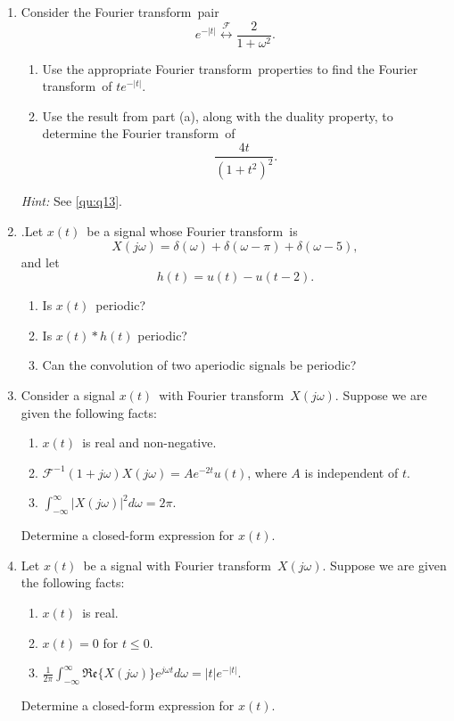 \documentclass[11pt]{article}
\newcommand\ft{Fourier transform}
\newcommand\xt{$x(t)$}
\newcommand\xo{$X(j\omega)$}
\begin{document}
\begin{enumerate}
    \item Consider the \ft~pair
    \begin{equation*}
        e^{-|t|} \overset{\mathcal{F}}{\longleftrightarrow} \frac{2}{1+\omega^2}.
    \end{equation*}
    \begin{enumerate}
        \item Use the appropriate \ft~properties to find the \ft~of $te^{-|t|}$.
        \item Use the result from part (a), along with the duality property, to determine the \ft~of
        \begin{equation*}
          \frac{4t}{(1+t^2)^2}.
        \end{equation*}
    \end{enumerate}
    \emph{Hint:} See \ref{qu:q13}.

    \item \label{qu:q13}.Let \xt~be a signal whose \ft~is
    \begin{equation*}
        X(j\omega) =\delta(\omega)+\delta(\omega -\pi) + \delta(\omega-5),
    \end{equation*}
    and let
    \begin{equation*}
        h(t) = u(t) - u(t-2).
    \end{equation*}
    \begin{enumerate}
        \item Is \xt~periodic?
        \item Is $x(t)\ast h(t)$ periodic?
        \item Can the convolution of two aperiodic signals be periodic?
    \end{enumerate}

    \item  Consider a signal \xt~with \ft~\xo. Suppose we are given the following facts:
    \begin{enumerate}
        \item \xt~is real and non-negative.
        \item $\mathcal{F}^{-1}{(1+j\omega)X(j\omega)} = Ae^{-2t}u(t)$, where $A$ is independent of $t$.
        \item $\int_{-\infty}^{\infty}|X(j\omega)|^2d\omega = 2\pi$.
    \end{enumerate}
    Determine a closed-form expression for \xt.

    \item  Let \xt~be a signal with \ft~\xo. Suppose we are given the following facts:
    \begin{enumerate}
        \item \xt~is real.
        \item $x(t)=0$ for $t\leq 0$.
        \item $\frac{1}{2\pi}\int_{-\infty}^{\infty}\mathfrak{Re} \{ X(j\omega)\}e^{j\omega t}d\omega = |t|e^{-|t|}$.
    \end{enumerate}
    Determine a closed-form expression for \xt.


\end{enumerate}
\end{document}
